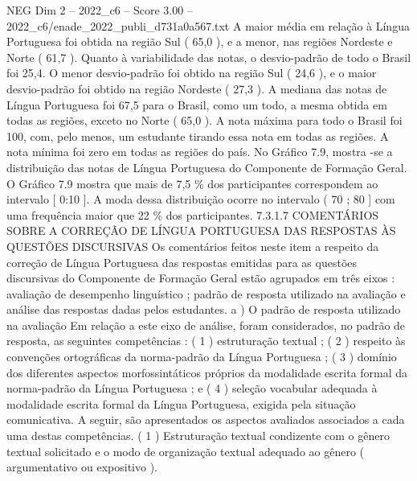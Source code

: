 \begin{textsample}{NEG Dim 2 – 2022\_c6 – Score 3.00 – 2022\_c6/enade\_2022\_publi\_d731a0a567.txt}
A maior média em relação à Língua Portuguesa foi obtida na região Sul ( 65,0 ), e a menor, nas regiões Nordeste e Norte ( 61,7 ).
Quanto à variabilidade das notas, o desvio-padrão de todo o Brasil foi 25,4.
O menor desvio-padrão foi obtido na região Sul ( 24,6 ), e o maior desvio-padrão foi obtido na região Nordeste ( 27,3 ).
A mediana das notas de Língua Portuguesa foi 67,5 para o Brasil, como um todo, a mesma obtida em todas as regiões, exceto no Norte ( 65,0 ).
A nota máxima para todo o Brasil foi 100, com, pelo menos, um estudante tirando essa nota em todas as regiões.
A nota mínima foi zero em todas as regiões do país.
No Gráfico 7.9, mostra -se a distribuição das notas de Língua Portuguesa do Componente de Formação Geral.
O Gráfico 7.9 mostra que mais de 7,5 \% dos participantes correspondem ao intervalo [ 0:10 ].
A moda dessa distribuição ocorre no intervalo ( 70 ; 80 ] com uma frequência maior que 22 \% dos participantes. 7.3.1.7 COMENTÁRIOS SOBRE A CORREÇÃO DE LÍNGUA PORTUGUESA DAS RESPOSTAS ÀS QUESTÕES DISCURSIVAS Os comentários feitos neste item a respeito da correção de Língua Portuguesa das respostas emitidas para as questões discursivas do Componente de Formação Geral estão agrupados em três eixos : avaliação de desempenho linguístico ; padrão de resposta utilizado na avaliação e análise das respostas dadas pelos estudantes. a ) O padrão de resposta utilizado na avaliação Em relação a este eixo de análise, foram considerados, no padrão de resposta, as seguintes competências : ( 1 ) estruturação textual ; ( 2 ) respeito às convenções ortográficas da norma-padrão da Língua Portuguesa ; ( 3 ) domínio dos diferentes aspectos morfossintáticos próprios da modalidade escrita formal da norma-padrão da Língua Portuguesa ; e ( 4 ) seleção vocabular adequada à modalidade escrita formal da Língua Portuguesa, exigida pela situação comunicativa.
A seguir, são apresentados os aspectos avaliados associados a cada uma destas competências. ( 1 ) Estruturação textual condizente com o gênero textual solicitado e o modo de organização textual adequado ao gênero ( argumentativo ou expositivo ).

\end{textsample}
